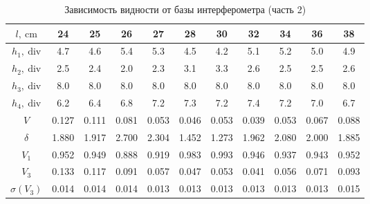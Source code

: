 \documentclass[12pt, a4paper]{article}
\begin{document}
\begin{table}[h!]
    \centering
    \caption{Зависимость видности от базы интерферометра (часть 2)}
    \begin{tabular}{|c|c|c|c|c|c|c|c|c|c|c|}
        \hline
        $l,~\mathrm{cm}$    & 24    & 25    & 26    & 27    & 28    & 30    & 32    & 34    & 36    & 38    \\
        \hline
        $h_1,~\mathrm{div}$ & 4.7   & 4.6   & 5.4   & 5.3   & 4.5   & 4.2   & 5.1   & 5.2   & 5.0   & 4.9   \\
        \hline
        $h_2,~\mathrm{div}$ & 2.5   & 2.4   & 2.0   & 2.3   & 3.1   & 3.3   & 2.6   & 2.5   & 2.5   & 2.6   \\
        \hline
        $h_3,~\mathrm{div}$ & 8.0   & 8.0   & 8.0   & 8.0   & 8.0   & 8.0   & 8.0   & 8.0   & 8.0   & 8.0   \\
        \hline
        $h_4,~\mathrm{div}$ & 6.2   & 6.4   & 6.8   & 7.2   & 7.3   & 7.2   & 7.4   & 7.2   & 7.0   & 6.7   \\
        \hline
        $V$                 & 0.127 & 0.111 & 0.081 & 0.053 & 0.046 & 0.053 & 0.039 & 0.053 & 0.067 & 0.088 \\
        \hline
        $\delta$            & 1.880 & 1.917 & 2.700 & 2.304 & 1.452 & 1.273 & 1.962 & 2.080 & 2.000 & 1.885 \\
        \hline
        $V_1$               & 0.952 & 0.949 & 0.888 & 0.919 & 0.983 & 0.993 & 0.946 & 0.937 & 0.943 & 0.952 \\
        \hline
        $V_3$               & 0.133 & 0.117 & 0.091 & 0.057 & 0.047 & 0.053 & 0.041 & 0.056 & 0.071 & 0.093 \\
        \hline
        $\sigma(V_3)$       & 0.014 & 0.014 & 0.014 & 0.013 & 0.013 & 0.013 & 0.013 & 0.013 & 0.013 & 0.015 \\
        \hline
    \end{tabular}
\end{table}
\end{document}
